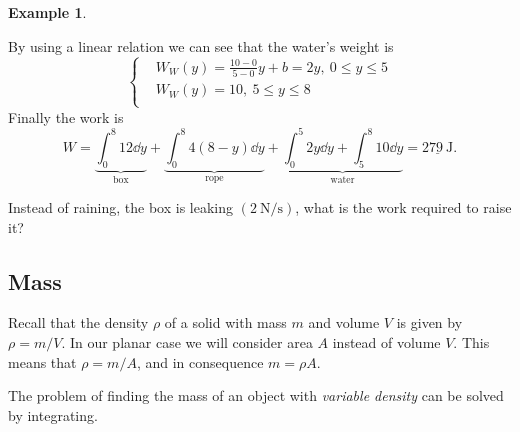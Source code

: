 \documentclass[12pt]{article}
\theoremstyle{plain}
\theoremstyle{definition}
\newtheorem{Ex}[Th]{Example}           %
\theoremstyle{remark}
\renewcommand{\leq}{\leqslant}      %
\renewcommand{\:}{\colon}           %
\newcommand{\un}[1]{\underline{#1}}
\renewcommand{\.}{\Cdot}                %
\begin{document}
\begin{multicols}{2}
\begin{Ex}
\begin{center}
  \end{center}
  \vspace*{-0.8em}
By using a linear relation we can see that the water's weight is 
$$
\left\lbrace
\begin{aligned}
  &W_W(y)=\frac{10-0}{5-0}y+b=2y,\ 0\leq y\leq 5\\
  &W_W(y)=10,\ 5\leq y\leq 8\\
\end{aligned}
\right.
$$
Finally the work is 
$$W=\underbrace{\int_0^{8} 12\dd y}_{\text{box}}+\underbrace{\int_0^{8}4(8-y)\dd y}_{\text{rope}}+\underbrace{\int_0^{5}2y\dd y+\int_5^{8}10\dd y}_{\text{water}}=\un{279\ \si\joule}.$$
\end{Ex}
\vspace*{-1em}
\begin{ptcbP}
Instead of raining, the box is leaking $(2\ \si{\newton\per\second})$, what is the work required to raise it?
\end{ptcbP}

\subsection*{Mass}

Recall that the density $\rho$ of a solid with mass $m$ and volume $V$ is given by $\rho= m/V$. In our planar case we will consider area $A$ instead of volume $V$. This means that $\rho=m/A$, and in consequence $m=\rho A$.\par 
The problem of finding the mass of an object with \emph{variable density} can be solved by integrating.


\end{multicols}
\end{document}
